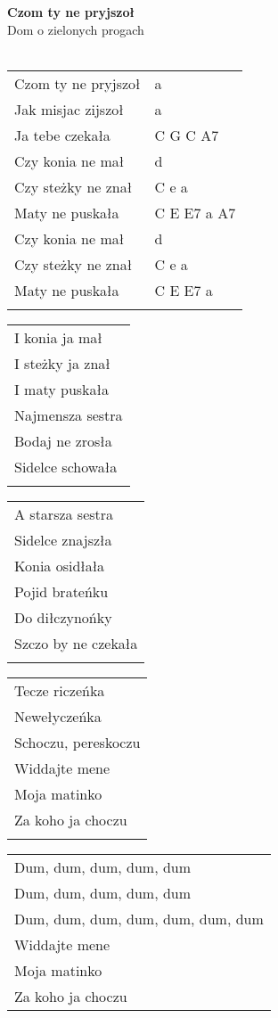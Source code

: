 \documentclass[a5paper]{article}
\begin{document}


\noindent
\fontsize{12pt}{15pt}\selectfont
\textbf{Czom ty ne pryjszoł} \\
\fontsize{8pt}{10pt}\selectfont
Dom o zielonych progach \\ \\
\fontsize{10pt}{12pt}\selectfont
{}
\begin{tabular}{@{}p{6.50cm}p{3cm}@{}}
\noindent
Czom ty ne pryjszoł & a \\
Jak misjac zijszoł & a \\
Ja tebe czekała	& C G C A7 \\
Czy konia ne mał & d\\
Czy steżky ne znał & C e a \\
Maty ne puskała	& C E E7 a A7 \\
Czy konia ne mał & d \\
Czy steżky ne znał & C e a \\
Maty ne puskała	& C E E7 a \\ \\
\end{tabular}

\noindent
\begin{tabular}{@{}p{8.50cm}@{}}
I konia ja mał \\
I steżky ja znał \\
I maty puskała \\
Najmensza sestra \\
Bodaj ne zrosła \\
Sidelce schowała \\ \\
\end{tabular}

\noindent
\begin{tabular}{@{}p{8.50cm}@{}}
A starsza sestra \\
Sidelce znajszła \\
Konia osidłała \\
Pojid brateńku \\
Do diłczynońky \\
Szczo by ne czekała \\ \\
\end{tabular}

\noindent
\begin{tabular}{@{}p{8.50cm}@{}}
Tecze riczeńka \\
Newełyczeńka \\
Schoczu, pereskoczu \\
Widdajte mene \\
Moja matinko \\
Za koho ja choczu \\ \\
\end{tabular}

\noindent
\begin{tabular}{@{}p{8.50cm}@{}}
Dum, dum, dum, dum, dum \\
Dum, dum, dum, dum, dum \\
Dum, dum, dum, dum, dum, dum, dum \\
Widdajte mene \\
Moja matinko \\
Za koho ja choczu \\
\end{tabular}
\end{document}
